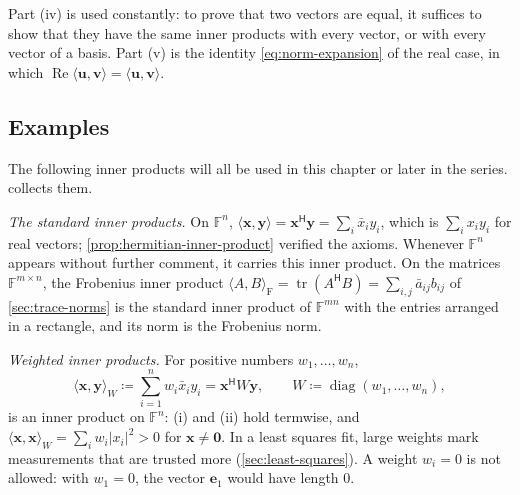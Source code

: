 Part (iv) is used constantly: to prove that two vectors are equal, it suffices to show that they have the same inner products with every vector, or with every vector of a basis. Part (v) is the identity \eqref{eq:norm-expansion} of the real case, in which $\operatorname{Re}\langle\mathbf u,\mathbf v\rangle=\langle\mathbf u,\mathbf v\rangle$.

\subsection{Examples}

The following inner products will all be used in this chapter or later in the series.  collects them.

\emph{The standard inner products.} On $\mathbb F^n$, $\langle\mathbf x,\mathbf y\rangle=\mathbf x^{\mathsf H}\mathbf y=\sum_i\bar x_iy_i$, which is $\sum_ix_iy_i$ for real vectors; \cref{prop:hermitian-inner-product} verified the axioms. Whenever $\mathbb F^n$ appears without further comment, it carries this inner product. On the matrices $\mathbb F^{m\times n}$, the Frobenius inner product $\langle A,B\rangle_{\mathrm F}=\operatorname{tr}(A^{\mathsf H}B)=\sum_{i,j}\bar a_{ij}b_{ij}$ of \cref{sec:trace-norms} is the standard inner product of $\mathbb F^{mn}$ with the entries arranged in a rectangle, and its norm is the Frobenius norm.

\emph{Weighted inner products.} For positive numbers $w_1,\ldots,w_n$,
\[
\langle\mathbf x,\mathbf y\rangle_W\coloneqq\sum_{i=1}^nw_i\bar x_iy_i=\mathbf x^{\mathsf H}W\mathbf y,\qquad W\coloneqq\operatorname{diag}(w_1,\ldots,w_n),
\]
is an inner product on $\mathbb F^n$: (i) and (ii) hold termwise, and $\langle\mathbf x,\mathbf x\rangle_W=\sum_iw_i|x_i|^2>0$ for $\mathbf x\ne\mathbf 0$. In a least squares fit, large weights mark measurements that are trusted more (\cref{sec:least-squares}). A weight $w_i=0$ is not allowed: with $w_1=0$, the vector $\mathbf e_1$ would have length $0$.

